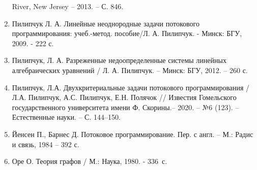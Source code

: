\documentclass[14pt]{extarticle}%
\begin{document}
\begin{enumerate}
River, New Jersey -- 2013. -- С. 846.
\item Пилипчук Л. А. Линейные неоднородные задачи потокового
программирования: учеб.-метод. пособие/Л. А. Пилипчук. -
Минск: БГУ, 2009. - 222 с.
\item Пилипчук, Л. А. Разреженные недоопределенные системы
линейных алгебраических уравнений / Л. А. Пилипчук. -- Минск:
БГУ, 2012. -- 260 с.
\item Пилипчук, Л.А. Двухкритериальные задачи потокового
программирования / Л.А. Пилипчук, А.С. Пилипчук, Е.Н. Полячок
// Известия Гомельского государственного университета имени Ф.
Скорины.-- 2020. -- №6 (123). -- Естественные науки. -- С. 144--150.
\item Йенсен П., Барнес Д. Потоковое программирование. Пер. с англ. --
М.: Радис и связь, 1984 -- 392 с.
\item Оре О. Теория графов / М.: Наука, 1980. - 336 с.\end{enumerate}
\end{document}
